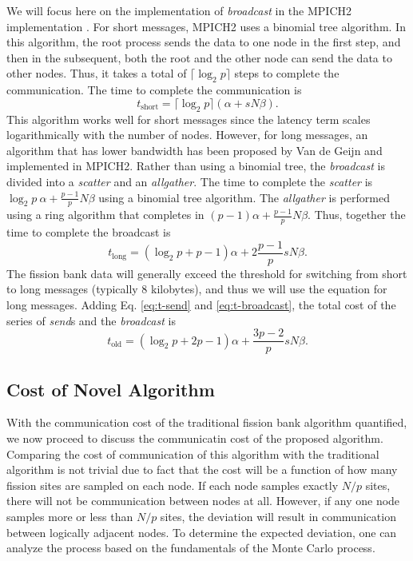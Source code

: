 \documentclass[11pt]{article}
\begin{document}
We will focus here on the implementation of \emph{broadcast} in the
MPICH2 implementation \cite{mpich}. For short messages, MPICH2 uses a
binomial tree algorithm. In this algorithm, the root process sends the
data to one node in the first step, and then in the subsequent, both
the root and the other node can send the data to other nodes. Thus, it
takes a total of $\lceil \log_2 p \rceil$ steps to complete the
communication. The time to complete the communication is
\begin{equation}
  t_{\text{short}} = \lceil \log_2 p \rceil \left ( \alpha + sN\beta
  \right ).
\end{equation}
This algorithm works well for short messages since the latency term
scales logarithmically with the number of nodes. However, for long
messages, an algorithm that has lower bandwidth has been proposed by
Van de Geijn \cite{vandegeijn} and implemented in MPICH2. Rather than
using a binomial tree, the \emph{broadcast} is divided into a
\emph{scatter} and an \emph{allgather}. The time to complete the
\emph{scatter} is $ \log_2 p \: \alpha + \frac{p-1}{p} N\beta$ using a
binomial tree algorithm. The \emph{allgather} is performed using a
ring algorithm that completes in $(p-1) \alpha + \frac{p-1}{p}
N\beta$. Thus, together the time to complete the broadcast is
\begin{equation}\label{eq:t-broadcast}
  t_{\text{long}} = \left ( \log_2 p + p - 1 \right ) \alpha + 2
  \frac{p-1}{p} sN\beta.
\end{equation}
The fission bank data will generally exceed the threshold for
switching from short to long messages (typically 8 kilobytes), and
thus we will use the equation for long messages. Adding
Eq. \ref{eq:t-send} and \ref{eq:t-broadcast}, the total cost of the
series of \emph{send}s and the \emph{broadcast} is
\begin{equation}
  t_{\text{old}} = \left ( \log_2 p + 2p - 1 \right ) \alpha +
  \frac{3p-2}{p} sN\beta.
\end{equation}

\subsection{Cost of Novel Algorithm}

With the communication cost of the traditional fission bank algorithm
quantified, we now proceed to discuss the communicatin cost of the
proposed algorithm. Comparing the cost of communication of this
algorithm with the traditional algorithm is not trivial due to fact
that the cost will be a function of how many fission sites are sampled
on each node. If each node samples exactly $N/p$ sites, there will not
be communication between nodes at all. However, if any one node
samples more or less than $N/p$ sites, the deviation will result in
communication between logically adjacent nodes. To determine the
expected deviation, one can analyze the process based on the
fundamentals of the Monte Carlo process.
\end{document}
